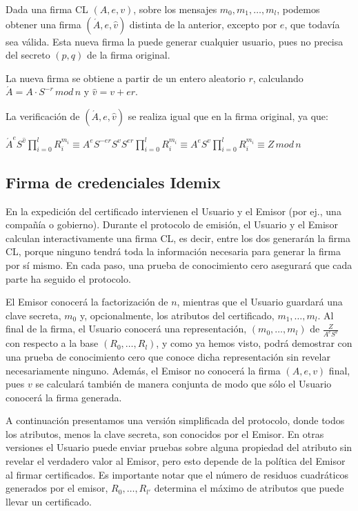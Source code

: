 Dada una firma CL $(A,e,v)$, sobre los mensajes  $m_0,m_1,\dots,m_l$, podemos obtener una firma $(\acute{A},e,\hat{v})$ distinta de la anterior, excepto por $e$, que todavía sea válida. Esta nueva firma la puede generar cualquier usuario, pues no precisa del secreto $(p,q)$ de la firma original.

La nueva firma se obtiene a partir de un entero aleatorio $r$, calculando $\acute{A}= A\cdot S^{-r}\, mod\, n$ y $\hat{v}=v+er$.

La verificación de $(\acute{A},e,\hat{v})$ se realiza igual que en la firma original, ya que:

\begin{center}
	$
	\acute{A}^e S^{\hat{v}} \prod_{i=0}^{l} R_i^{m_i} \equiv A^e S^{-er} S^v S^{er} \prod_{i=0}^{l} R_i^{m_i} \equiv A^e S^v \prod_{i=0}^{l} R_i^{m_i} \equiv Z \, mod \, n
	$
\end{center}


\subsection{Firma de credenciales Idemix}

En la expedición del certificado intervienen el Usuario y el Emisor (por ej., una compañía o gobierno). Durante el protocolo de emisión, el Usuario y el Emisor calculan interactivamente una firma CL, es decir, entre los dos generarán la firma CL, porque ninguno tendrá toda la información necesaria para generar la firma por sí mismo. En cada paso, una prueba de conocimiento cero asegurará que cada parte ha seguido el protocolo.

El Emisor conocerá la factorización de $n$, mientras que el Usuario guardará una clave secreta, $m_0$ y, opcionalmente, los atributos del certificado, $m_1,\dots,m_l$. Al final de la firma, el Usuario conocerá una representación, $(m_0,\dots,m_l)$ de $\frac{Z}{A^eS^v}$ con respecto a la base $(R_0,\dots,R_l)$, y como ya hemos visto, podrá demostrar con una prueba de conocimiento cero que conoce dicha representación sin revelar necesariamente ninguno. Además, el Emisor no conocerá la firma $(A,e,v)$ final, pues $v$ se calculará también de manera conjunta de modo que sólo el Usuario conocerá la firma generada.

\hfil

A continuación presentamos una versión simplificada del protocolo, donde todos los atributos, menos la clave secreta, son conocidos por el Emisor. En otras versiones el Usuario puede enviar pruebas sobre alguna propiedad del atributo sin revelar el verdadero valor al Emisor, pero esto depende de la política del Emisor al firmar certificados. Es importante notar que el número de residuos cuadráticos generados por el emisor, $R_0,\dots,R_{l'}$ determina el máximo de atributos que puede llevar un certificado.

